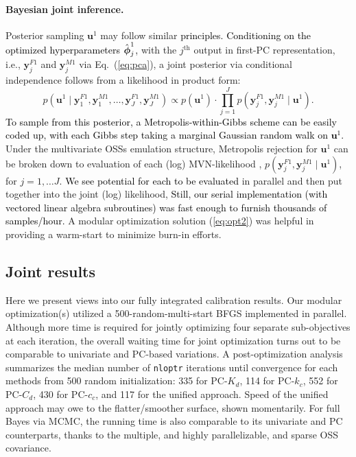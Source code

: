 \documentclass[12pt]{article}
\newcommand{\blu}[1]{\textcolor{black}{#1}} %
\newcommand{\blunew}[1]{\textcolor{black}{#1}} %
\newcommand{\bm}[1]{\mbox{\boldmath $#1$}}
\begin{document}
\paragraph{Bayesian joint inference.}
Posterior sampling $\mathbf{u}^1$ may follow similar \blu{principles.} 
\blunew{Conditioning on the optimized hyperparameters $\hat{\bm{\phi}}^1_j$, }
with the $j^\mathrm{th}$ output in first-PC representation, i.e., $\mathbf{y}^{F1}_j$
and $\mathbf{y}^{M1}_j$ via Eq.~(\ref{eq:pca}), a joint posterior via
conditional independence follows from a likelihood in product form:
\begin{equation}
p(\mathbf{u}^1 \mid \mathbf{y}^{F1}_1, \mathbf{y}^{M1}_1, \dots, 
\mathbf{y}^{F1}_J, \mathbf{y}^{M1}_J )
\propto p(\mathbf{u}^1) \cdot \prod^J_{j = 1} 
p( \mathbf{y}^{F1}_j, \mathbf{y}^{M1}_j \mid \mathbf{u}^1).
\label{eq:lik}
\end{equation}
\blu{To sample from this posterior, a Metropolis-within-Gibbs scheme
can be easily coded up, with each Gibbs step taking a marginal Gaussian 
random walk on $\mathbf{u}^1$.}
Under the multivariate OSSs emulation structure,  Metropolis rejection for
$\mathbf{u}^1$ can be broken down to evaluation of each (log) MVN-likelihood
, $p( \mathbf{y}^{F1}_j, \mathbf{y}^{M1}_j \mid \mathbf{u}^1)$, for $j= 1,
\dots J$. \blu{We see potential for each to be evaluated} in parallel and then put together into the 
joint (log) likelihood, \blu{Still, our serial implementation (with vectored linear algebra subroutines)
was fast enough to furnish thousands of samples/hour.}
A modular optimization solution (\ref{eq:opt2}) was helpful in providing a warm-start to
minimize burn-in efforts.

\subsection{Joint results}
\label{sec:baysresults}

Here we present views into our fully integrated calibration results. Our
modular optimization(s) utilized a 500-random-multi-start BFGS implemented in
parallel. Although more time is required for jointly optimizing four separate
sub-objectives at each iteration, the overall waiting time for joint
optimization turns out to be comparable to univariate and PC-based variations.
A post-optimization analysis summarizes the median number  of {\tt nloptr}
iterations until convergence for each methods  from 500 random initialization:
335 for PC-$K_d$, 114 for PC-$k_c$, 552 for PC-$C_d$, 430 for PC-$c_c$, and
117 for the unified approach.   Speed of the unified approach may owe to the
flatter/smoother surface, shown momentarily.  For full Bayes via MCMC, the
running time is also comparable to its univariate and PC counterparts, thanks
to the multiple, and highly parallelizable, and sparse OSS covariance.
\end{document}
